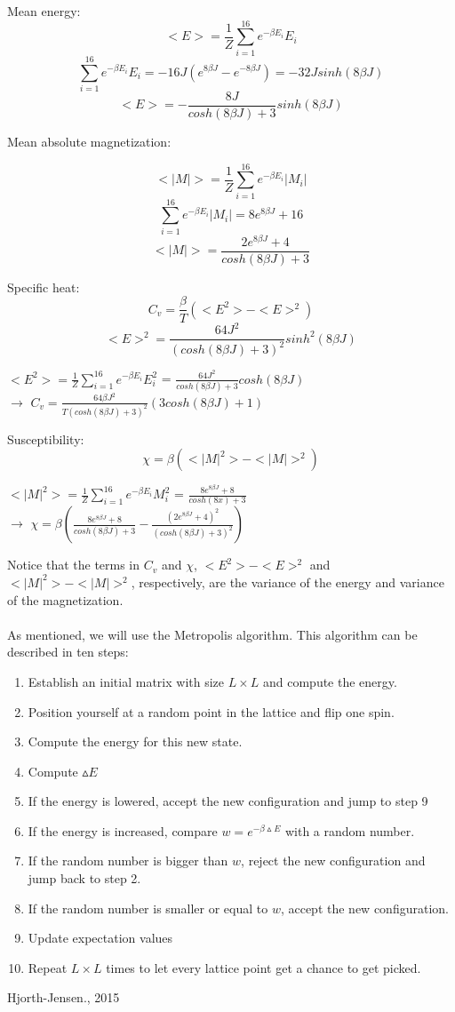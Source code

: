 \documentclass[10pt,a4paper]{article}
\begin{document}
Mean energy:
$$<E> = \frac{1}{Z}\sum\limits_{i=1}^{16}e^{-\beta E_i}E_i$$
$$\sum\limits_{i=1}^{16}e^{-\beta E_i}E_i = -16J(e^{8\beta J}-e^{-8\beta J})=-32Jsinh(8\beta J)$$
$$<E>=-\frac{8J}{cosh(8\beta J)+3}sinh(8\beta J)$$

Mean absolute magnetization:

$$<|M|>=\frac{1}{Z}\sum\limits_{i=1}^{16}e^{-\beta E_i}|M_i|$$
$$\sum\limits_{i=1}^{16}e^{-\beta E_i}|M_i|=8e^{8\beta J}+16$$
$$<|M|>=\frac{2e^{8\beta J}+4}{cosh(8\beta J)+3}$$

Specific heat:
$$C_v = \frac{\beta}{T}(<E^2>-<E>^2)$$
$$<E>^2=\frac{64J^2}{(cosh(8\beta J)+3)^2}sinh^2(8\beta J)$$
\begin{center}
$<E^2>=\frac{1}{Z}\sum\limits_{i=1}^{16}e^{-\beta E_i}E_i^2$ = $\frac{64J^2}{cosh(8\beta J)+3}cosh(8\beta J)$\\
$\rightarrow$
$C_v = \frac{64\beta J^2}{T(cosh(8\beta J)+3)^2}(3cosh(8\beta J)+1)$
\end{center}

Susceptibility:
$$\chi=\beta(<|M|^2>-<|M|>^2)$$
\begin{center}
$<|M|^2>=\frac{1}{Z}\sum\limits_{i=1}^{16}e^{-\beta E_i}M_i^2$ = $\frac{8e^{8\beta J}+8}{cosh(8x)+3}$\\
$\rightarrow$
$\chi = \beta(\frac{8e^{8\beta J}+8}{cosh(8\beta J)+3}-\frac{(2e^{8\beta J}+4)^2}{(cosh(8\beta J)+3)^2})$\\
\end{center}
\noindent Notice that the terms in $C_v$ and $\chi$, $<E^2>-<E>^2$ and $<|M|^2>-<|M|>^2$, respectively, are the variance of the energy and variance of the magnetization.\\
\\
As mentioned, we will use the Metropolis algorithm. This algorithm can be described in ten steps:\begin{enumerate}
\item Establish an initial matrix with size $L \times L$ and compute the energy.
\item Position yourself at a random point in the lattice and flip one spin.
\item Compute the energy for this new state.
\item Compute $\vartriangle E$ 
\item If the energy is lowered, accept the new configuration and jump to step 9
\item If the energy is increased, compare $w=e^{-\beta \vartriangle E}$ with a random number.
\item If the random number is bigger than $w$, reject the new configuration and jump back to step 2.
\item If the random number is smaller or equal to $w$, accept the new configuration. 
\item Update expectation values
\item Repeat $L \times L$ times to let every lattice point get a chance to get picked.
\end{enumerate}
\hfill{Hjorth-Jensen., 2015}\\
\end{document}
